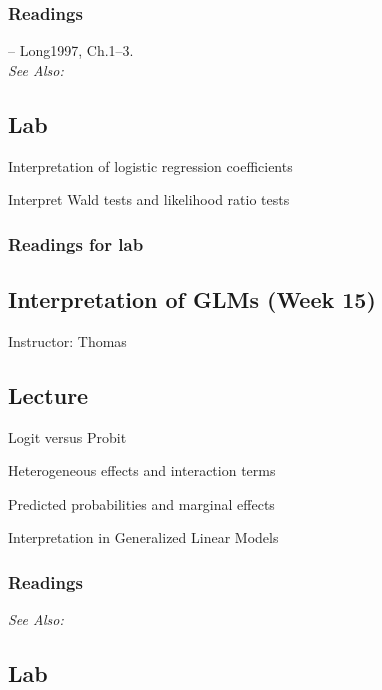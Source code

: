 \documentclass[11pt,a4paper]{article}
\newcommand{\textbook}[2][]{\noindent -- {#2}, {#1}.\vspace{.25em}\\}
\newcommand{\thomas}{\vspace{1em}\noindent Instructor: Thomas\vspace{1em}\\}
\newcommand{\seealso}{\noindent \emph{See Also:}\\}
\begin{document}
\subsubsection*{Readings}
\textbook[Ch.1--3]{Long1997}


\seealso


\subsection*{Lab}

\begin{itemize*}
\item Interpretation of logistic regression coefficients
\item Interpret Wald tests and likelihood ratio tests
\end{itemize*}

\subsubsection*{Readings for lab}


\clearpage
\subsection{Interpretation of GLMs (Week 15)}
\emph{}

\thomas

\subsection*{Lecture}
\begin{itemize*}
\item Logit versus Probit %
\item Heterogeneous effects and interaction terms
\item Predicted probabilities and marginal effects
\item Interpretation in Generalized Linear Models
\end{itemize*}

\subsubsection*{Readings}

\seealso


\subsection*{Lab}
\end{document}
